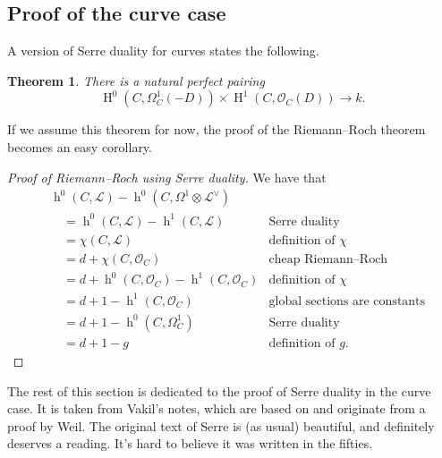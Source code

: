 \documentclass[10pt,a4paper]{article}
\theoremstyle{lecture}
\newtheorem{theorem}{Theorem}
\DeclareMathOperator\hh{h}
\DeclareMathOperator\HH{H}
\begin{document}
\subsection{Proof of the curve case}
\label{subsection:serre-duality-curves}
A version of Serre duality for curves states the following.
\begin{theorem}
  \label{theorem:serre-duality-curves}
  There is a natural perfect pairing
  \begin{equation}
    \HH^0(C,\Omega_C^1(-D))\times\HH^1(C,\mathcal{O}_C(D))\to k.
  \end{equation}
\end{theorem}
If we assume this theorem for now, the proof of the Riemann--Roch theorem becomes an easy corollary.
\begin{proof}[Proof of Riemann--Roch using Serre duality]
  We have that
  \begin{equation}
    \begin{aligned}
      &\hh^0(C,\mathcal{L})-\hh^0(C,\Omega^1\otimes\mathcal{L}^\vee) \\
      &\quad=\hh^0(C,\mathcal{L})-\hh^1(C,\mathcal{L}) & \text{Serre duality} \\
      &\quad=\chi(C,\mathcal{L}) & \text{definition of~$\chi$} \\
      &\quad=d+\chi(C,\mathcal{O}_C) & \text{cheap Riemann--Roch} \\
      &\quad=d+\hh^0(C,\mathcal{O}_C)-\hh^1(C,\mathcal{O}_C) & \text{definition of~$\chi$} \\
      &\quad=d+1-\hh^1(C,\mathcal{O}_C) & \text{global sections are constants} \\
      &\quad=d+1-\hh^0(C,\Omega_C^1) & \text{Serre duality} \\
      &\quad=d+1-g & \text{definition of $g$}.
    \end{aligned}
  \end{equation}
\end{proof}

The rest of this section is dedicated to the proof of Serre duality in the curve case. It is taken from Vakil's notes, which are based on \cite[\S 2]{serre-groupes-algebriques-et-corps-de-classes} and originate from a proof by Weil. The original text of Serre is (as usual) beautiful, and definitely deserves a reading. It's hard to believe it was written in the fifties.
\end{document}
